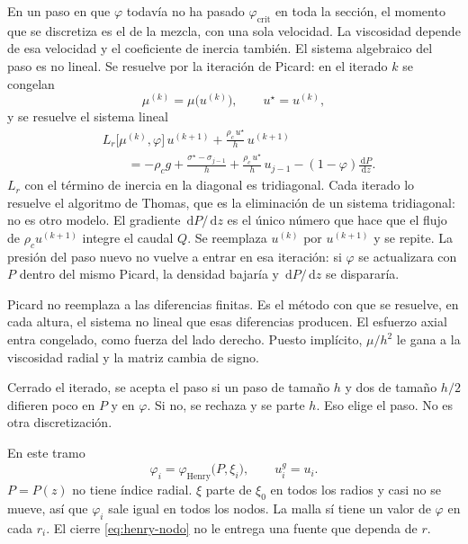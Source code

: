 \documentclass[11pt,a4paper]{article}
\newcommand{\dd}{\,\mathrm{d}}
\theoremstyle{plain}
\theoremstyle{definition}
\theoremstyle{remark}
\begin{document}
En un paso en que \(\varphi\) todavía no ha pasado \(\varphi_{\mathrm{crit}}\)
en toda la sección, el momento que se discretiza es el de la mezcla, con
una sola velocidad. La viscosidad depende de esa velocidad y el coeficiente
de inercia también. El sistema algebraico del paso es no lineal. Se resuelve
por la iteración de Picard: en el iterado \(k\) se congelan
\begin{equation}
\mu^{(k)}=\mu\bigl(u^{(k)}\bigr),
\qquad
u^{\star}=u^{(k)},
\label{eq:picard-coef}
\end{equation}
y se resuelve el sistema lineal
\begin{equation}
\begin{aligned}
&L_r\bigl[\mu^{(k)},\varphi\bigr]\,u^{(k+1)}
+\frac{\rho_c\,u^{\star}}{h}\,u^{(k+1)}
\\
&\qquad=
-\rho_c g
+\frac{\sigma^{\star}-\sigma_{j-1}}{h}
+\frac{\rho_c\,u^{\star}}{h}\,u_{j-1}
-(1-\varphi)\frac{\dd P}{\dd z}.
\end{aligned}
\label{eq:picard}
\end{equation}
\(L_r\) con el término de inercia en la diagonal es tridiagonal. Cada
iterado lo resuelve el algoritmo de Thomas, que es la eliminación de un
sistema tridiagonal: no es otro modelo. El gradiente \(\dd P/\dd z\) es el
único número que hace que el flujo de \(\rho_c u^{(k+1)}\) integre el
caudal \(Q\). Se reemplaza \(u^{(k)}\) por \(u^{(k+1)}\) y se repite. La
presión del paso nuevo no vuelve a entrar en esa iteración: si \(\varphi\)
se actualizara con \(P\) dentro del mismo Picard, la densidad bajaría y
\(\dd P/\dd z\) se dispararía.

Picard no reemplaza a las diferencias finitas. Es el método con que se
resuelve, en cada altura, el sistema no lineal que esas diferencias
producen. El esfuerzo axial entra congelado, como fuerza del lado derecho.
Puesto implícito, \(\mu/h^2\) le gana a la viscosidad radial y la matriz
cambia de signo.

Cerrado el iterado, se acepta el paso si un paso de tamaño \(h\) y dos de
tamaño \(h/2\) difieren poco en \(P\) y en \(\varphi\). Si no, se rechaza
y se parte \(h\). Eso elige el paso. No es otra discretización.

En este tramo
\begin{equation}
\varphi_i=\varphi_{\mathrm{Henry}}\bigl(P,\xi_i\bigr),
\qquad
u^g_i=u_i.
\label{eq:henry-nodo}
\end{equation}
\(P=P(z)\) no tiene índice radial. \(\xi\) parte de \(\xi_0\) en todos los
radios y casi no se mueve, así que \(\varphi_i\) sale igual en todos los
nodos. La malla sí tiene un valor de \(\varphi\) en cada \(r_i\). El cierre
\eqref{eq:henry-nodo} no le entrega una fuente que dependa de \(r\).
\end{document}
